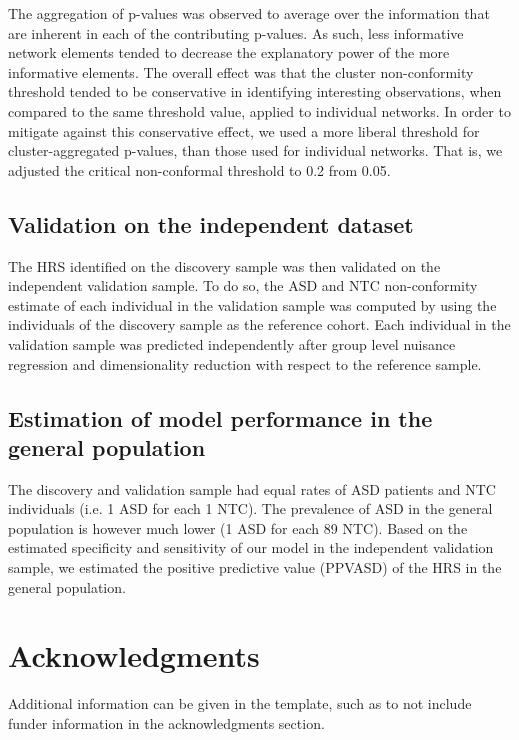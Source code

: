 \documentclass[9pt,lineno]{elife}
\begin{document}
The aggregation of p-values was observed to average over the information that are inherent in each of the contributing p-values. As such, less informative network elements tended to decrease the explanatory power of the more informative elements. The overall effect was that the cluster non-conformity threshold tended to be conservative in identifying interesting observations, when compared to the same threshold value, applied to individual networks. In order to mitigate against this conservative effect, we used a more liberal threshold for cluster-aggregated p-values, than those used for individual networks. That is, we adjusted the critical non-conformal threshold to 0.2 from 0.05. 

\subsection{Validation on the independent dataset}
The HRS identified on the discovery sample was then validated on the independent validation sample. To do so, the ASD and NTC non-conformity estimate of each individual in the validation sample was computed by using the individuals of the discovery sample as the reference cohort. Each individual in the validation sample was predicted independently after group level nuisance regression and dimensionality reduction with respect to the reference sample.

\subsection{Estimation of model performance in the general population}
The discovery and validation sample had equal rates of ASD patients and NTC individuals (i.e. 1 ASD for each 1 NTC). The prevalence of ASD in the general population is however much lower (1 ASD for each 89 NTC). Based on the estimated specificity and sensitivity of our model in the independent validation sample, we estimated the positive predictive value (PPVASD) of the HRS in the general population.

\section{Acknowledgments}

Additional information can be given in the template, such as to not include funder information in the acknowledgments section.



\end{document}

